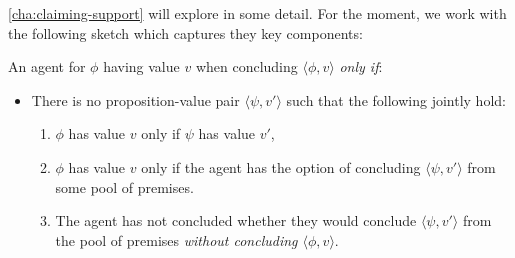 \begin{note}
  \begin{figure}[h]
    \centering
    \caption{\csN{} \illu{}}
    \label{fig:csN:illu:overview}
  \end{figure}
\end{note}

\begin{note}

  \autoref{cha:claiming-support} will explore \csN{} in some detail.
  For the moment, we work with the following sketch which captures they key components:
  \begin{idea}[\csN{2}]
    \label{assu:CS:overview}
    An agent \csV{} for \(\phi\) having value \(v\) when concluding \(\langle \phi,v \rangle\) \emph{only if}:
    \begin{itemize}
    \item
      There is no proposition-value pair \(\langle \psi, v' \rangle\) such that the following jointly hold:
      \begin{enumerate}
      \item \(\phi\) has value \(v\) only if \(\psi\) has value \(v'\),
      \item \(\phi\) has value \(v\) only if the agent has the option of concluding \(\langle \psi, v' \rangle\) from some pool of premises.
      \item The agent has not concluded whether they would conclude \(\langle \psi, v' \rangle\) from the pool of premises \emph{without concluding \(\langle \phi, v \rangle\)}.
      \end{enumerate}
    \end{itemize}
  \end{idea}
  
\end{note}

